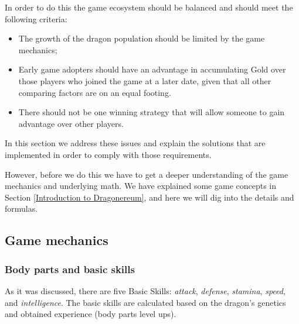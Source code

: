 \documentclass[12pt]{article}
\begin{document}
In order to do this the game ecosystem should be balanced and should meet the following criteria:\par

\begin{itemize}
	\item The growth of the dragon population should be limited by the game mechanics;\par

	\item Early game adopters should have an advantage in accumulating Gold over those players who joined the game at a later date, given that all other comparing factors are on an equal footing.\par

	\item There should not be one winning strategy that will allow someone to gain advantage over other players.
\end{itemize}\par

In this section we address these issues and explain the solutions that are implemented in order to comply with those requirements.\par

However, before we do this we have to get a deeper understanding of the game mechanics and underlying math. We have explained some game concepts in Section \ref{Introduction to Dragonereum}, and here we will dig into the details and formulas.\par

\subsection{Game mechanics}
 \label{Game mechanics}  \par

\subsubsection{Body parts and basic skills}\label{Body parts and basic skills}   \par

As it was discussed, there are five Basic Skills: \textit{attack}, \textit{defense}, \textit{stamina}, \textit{speed}, and \textit{intelligence}. The basic skills are calculated based on the dragon’s genetics and obtained experience (body parts level ups).\par
\end{document}
